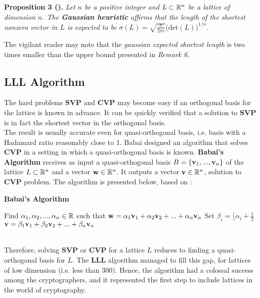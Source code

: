 \textbf{Proposition 3 (\cite{HPS08}).} \textit{Let $n$ be a positive integer and $L\subset \mathbb{R}^n$ be a lattice of dimension $n$. The \textbf{Gaussian heuristic} affirms that the length of the shortest nonzero vector in $L$ is expected to be} $\sigma(L) = \sqrt{\frac{n}{2\pi e}}\big(\text{det}(L)\big)^{1/n}$.

The vigilant reader may note that the \textit{gaussian expected shortest length} is two times smaller than the upper bound presented in \textit{Remark 6}. \\

\subsection{LLL Algorithm}

The hard problems \textbf{SVP} and \textbf{CVP} may become easy if an orthogonal basis for the lattice is known in advance. It can be quickly verified that a solution to \textbf{SVP} is in fact the shortest vector in the orthogonal basis.\\

The result is usually accurate even for quasi-orthogonal basis, i.e. basis with a Hadamard ratio reasonably close to 1. Babai designed an algorithm that solves \textbf{CVP} in a setting in which a quasi-orthogonal basis is known. \textbf{Babai's Algorithm} receives as input a quasi-orthogonal basis $B = \{\textbf{v}_1,...,\textbf{v}_n\}$ of the lattice $L \subset \mathbb{R}^n$ and a vector $\textbf{w} \in \mathbb{R}^n$. It outputs a vector $\textbf{v}\in \mathbb{R}^n$, solution to \textbf{CVP} problem. The algorithm is presented below, based on \cite{HPS08}:\\


\begin{tcolorbox}[colframe=black,colback=white,arc=0pt,outer arc=0pt]
	\begin{center}
		\textbf{Babai's Algorithm}
	\end{center}
	\begin{algorithmic}[1]
		\State Find $\alpha_1, \alpha_2,...,\alpha_n \in \mathbb{R} $ such that $\textbf{w} = \alpha_1\textbf{v}_1 + \alpha_2\textbf{v}_2+...+\alpha_n\textbf{v}_n$
		\State Set $\beta_i = \big\lfloor \alpha_i + \frac{1}{2}$\big\rfloor
		\EndFor
		\State $\textbf{v} = \beta_1 \textbf{v}_1 + \beta_2 \textbf{v}_2 +...+\beta_n\textbf{v}_n$
	\end{algorithmic}
\end{tcolorbox}
~\\

Therefore, solving \textbf{SVP} or \textbf{CVP} for a lattice $L$ reduces to finding a quasi-orthogonal basis for $L$. The \textbf{LLL} algorithm managed to fill this gap, for lattices of low dimension (i.e. less than 300). Hence, the algorithm had a colossal success among the cryptographers, and it represented the first step to include lattices in the world of cryptography.\\

